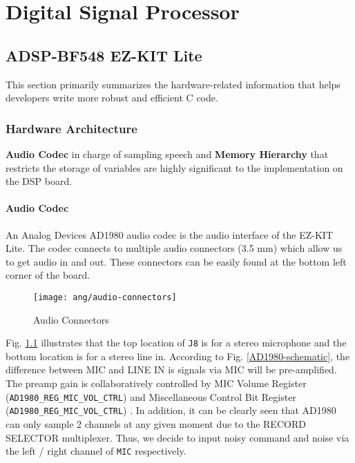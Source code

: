 \chapter{Digital Signal Processor}


\section{ADSP-BF548 EZ-KIT Lite}

This section primarily summarizes the hardware-related information that helps developers write more robust and efficient C code.


\subsection{Hardware Architecture}

\textbf{Audio Codec} in charge of sampling speech and \textbf{Memory Hierarchy} that restricts the storage of variables are highly significant to the implementation on the DSP board.


\subsubsection{Audio Codec}
An Analog Devices AD1980 audio codec is the audio interface of the EZ-KIT Lite. The codec connects to multiple audio connectors (3.5 mm) which allow us to get audio in and out. These connectors can be easily found at the bottom left corner of the board.

\begin{figure}[H]
\centering
\texttt{[image: ang/audio-connectors]}
\caption{Audio Connectors}
\label{audio-connectors}
\end{figure}

Fig. \ref{audio-connectors} illustrates that the top location of \texttt{J8} is for a stereo microphone and the bottom location is for a stereo line in. According to Fig. \ref{AD1980-schematic}, the difference between MIC and LINE IN is signals via MIC will be pre-amplified. The preamp gain is collaboratively controlled by MIC Volume Register (\texttt{AD1980\_REG\_MIC\_VOL\_CTRL}) and Miscellaneous Control Bit Register (\texttt{AD1980\_REG\_MIC\_VOL\_CTRL}) \cite{AC97-codec}. In addition, it can be clearly seen that AD1980 can only sample 2 channels at any given moment due to the RECORD SELECTOR multiplexer. Thus, we decide to input noisy command and noise via the left / right channel of \texttt{MIC} respectively.

